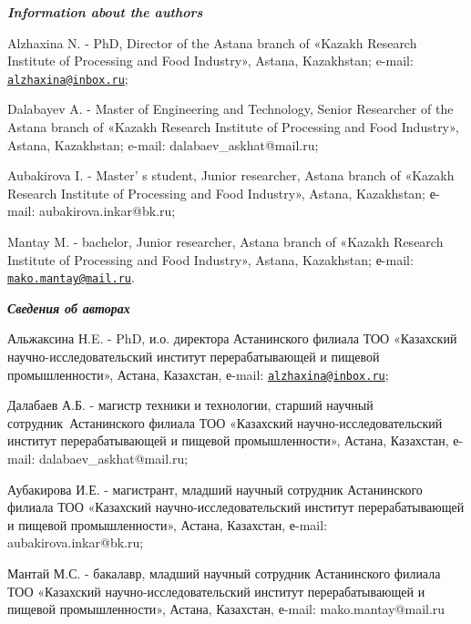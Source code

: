 \emph{{\bfseries Information about the authors}}

Alzhaxina N. - PhD, Director of the Astana branch of «Kazakh Research
Institute of Processing and Food Industry», Astana, Kazakhstan; e-mail:
\href{mailto:alzhaxina@inbox.ru}{\nolinkurl{alzhaxina@inbox.ru}};

Dalabayev A. - Master of Engineering and Technology, Senior Researcher
of the Astana branch of «Kazakh Research Institute of Processing and
Food Industry», Astana, Kazakhstan; e-mail: dalabaev\_askhat@mail.ru;

Aubakirova I. - Master' s student, Junior researcher,
Astana branch of «Kazakh Research Institute of Processing and Food
Industry», Astana, Kazakhstan; е-mail: aubakirova.inkar@bk.ru;

Mantay M. - bachelor, Junior researcher, Astana branch of «Kazakh
Research Institute of Processing and Food Industry», Astana, Kazakhstan;
е-mail:
\href{mailto:mako.mantay@mail.ru}{\nolinkurl{mako.mantay@mail.ru}}.

\emph{{\bfseries Сведения об авторах}}

Альжаксина Н.E. - PhD, и.о. директора Астанинского филиала ТОО
«Казахский научно-исследовательский институт перерабатывающей и пищевой
промышленности», Астана, Казахстан, е-mail:
\href{mailto:alzhaxina@inbox.ru}{\nolinkurl{alzhaxina@inbox.ru}};

Далабаев А.Б. - магистр техники и технологии, старший научный
сотрудник~Астанинского филиала ТОО «Казахский научно-исследовательский
институт перерабатывающей и пищевой промышленности», Астана, Казахстан,
е-mail: dalabaev\_askhat@mail.ru;

Аубакирова И.Е. - магистрант, младший научный сотрудник Астанинского
филиала ТОО «Казахский научно-исследовательский институт
перерабатывающей и пищевой промышленности», Астана, Казахстан, е-mail:
aubakirova.inkar@bk.ru;

Мантай М.С. - бакалавр, младший научный сотрудник Астанинского филиала
ТОО «Казахский научно-исследовательский институт перерабатывающей и
пищевой промышленности», Астана, Казахстан, е-mail: mako.mantay@mail.ru~